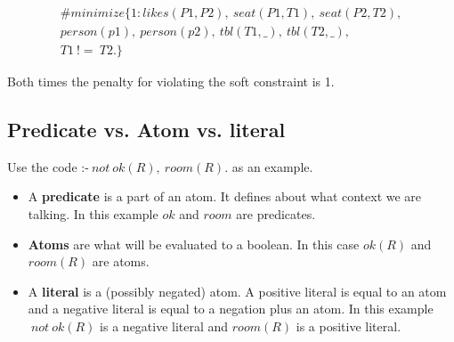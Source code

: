 \documentclass[runningheads]{llncs}
\newcommand{\ASPif}{\textrm{:-}}
\begin{document}
\begin{itemize}
\begin{equation}
    \label{formula:softConstraint2}
\begin{split}
\#minimize\{ 1:likes(P1,P2), ~ seat(P1,T1), ~ seat(P2,T2),\\
  person(p1), ~ person(p2), ~ tbl(T1,\_), ~ tbl(T2,\_),\\
  T1 ~ != ~ T2. \}
\end{split}
\end{equation}

Both times the penalty for violating the soft constraint is 1.

\end{itemize}


\subsection{Predicate vs. Atom vs. literal}


Use the code  $\ASPif ~ not ~ ok(R), ~ room(R).$ as an example.

\begin{itemize}
    \item A \textbf{predicate} is a part of an atom. It defines about what context we are talking. In this example $ok$ and $room$ are predicates.
    \item \textbf{Atoms} are what will be evaluated to a boolean. In this case $ok(R)$ and $room(R)$ are atoms. 
    \item A \textbf{literal} is a (possibly negated) atom. A positive literal is equal to an atom and a negative literal is equal to a negation plus an atom. In this example $~ not ~ ok(R)$ is a negative literal and $room(R)$ is a positive literal. 
\end{itemize}
\end{document}
